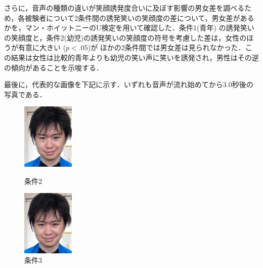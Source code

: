 \documentclass[submit,techreq]{ec2014}
\begin{document}
さらに，音声の種類の違いが笑顔誘発度合いに及ぼす影響の男女差を調べるため，各被験者について2条件間の誘発笑いの笑顔度の差について，男女差があるかを，マン・ホイットニーのU検定を用いて確認した．条件1(青年) の誘発笑いの笑顔度と，条件2(幼児)の誘発笑いの笑顔度の符号を考慮した差は，女性のほうが有意に大きい ($p < .05$)が
ほかの2条件間では男女差は見られなかった．この結果は女性は比較的青年よりも幼児の笑い声に笑いを誘発され，男性はその逆の傾向があることを示唆する．



最後に，代表的な画像を下記に示す．いずれも音声が流れ始めてから3.0秒後の写真である．

\begin{figure}[h!]
\begin{minipage}{0.49\columnwidth}
\begin{center}
\includegraphics[width=25mm, bb=0 0 663 834]{images/nagatatsucap_15.jpg}
\caption{条件2}
\end{center}
\end{minipage}
\begin{minipage}{0.49\columnwidth}
\begin{center}
\includegraphics[width=25mm, bb=0 0 663 834]{images/nagatatsucap_41.jpg}
\caption{条件3}
\end{center}
\end{minipage}
\end{figure}
\end{document}
